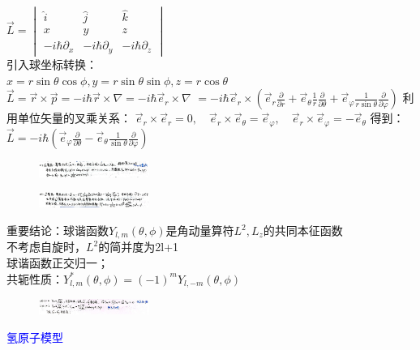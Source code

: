 \documentclass[a4paper,8pt]{extarticle} %
\newcommand{\bluetext}[1]{\textcolor{blue}{#1}}
\begin{document}
\begin{multicols}{3}
$\vec{L} = \begin{vmatrix} \hat{i} & \hat{j} & \hat{k} \\ x & y & z \\ -i\hbar\partial_x & -i\hbar\partial_y & -i\hbar\partial_z \end{vmatrix}$\\
引入球坐标转换：\\$x = r\sin\theta\cos\phi, y = r\sin\theta\sin\phi, z = r\cos\theta$\\
$\vec{L} = \vec{r} \times \vec{p} = -i\hbar\vec{r} \times \nabla = -i\hbar\vec{e}_r \times \nabla$
$= -i\hbar\vec{e}_r \times (\vec{e}_r \frac{\partial}{\partial r} + \vec{e}_\theta \frac{1}{r}\frac{\partial}{\partial \theta} + \vec{e}_\varphi \frac{1}{r\sin\theta}\frac{\partial}{\partial \varphi})$
利用单位矢量的叉乘关系：
$\vec{e}_r \times \vec{e}_r = 0, \quad \vec{e}_r \times \vec{e}_\theta = \vec{e}_\varphi, \quad \vec{e}_r \times \vec{e}_\varphi = -\vec{e}_\theta$
得到：
$\vec{L} = -i\hbar(\vec{e}_\varphi \frac{\partial}{\partial \theta} - \vec{e}_\theta \frac{1}{\sin\theta}\frac{\partial}{\partial \varphi})$
\begin{figure}[H]
    \centering
    \includegraphics[width=0.32\textwidth]{images/6.png}
    \vspace{-0.6cm}
\end{figure}
\begin{figure}[H]
    \centering
    \includegraphics[width=0.32\textwidth]{images/7.png}
    \vspace{-0.6cm}
\end{figure}
重要结论：球谐函数$Y_{l,m}(\theta,\phi)$是角动量算符$L^2,L_z$的共同本征函数\\
不考虑自旋时，$L^2$的简并度为2l+1\\
球谐函数正交归一；\\
共轭性质：$Y_{l,m}^*(\theta,\phi) = (-1)^mY_{l,-m}(\theta,\phi)$\\
\begin{figure}[H]
    \vspace{-0.5cm}
    \centering
    \includegraphics[width=0.32\textwidth]{images/8.png}
    \vspace{-0.6cm}
\end{figure}
\bluetext{氢原子模型}


\end{multicols}
\end{document}
